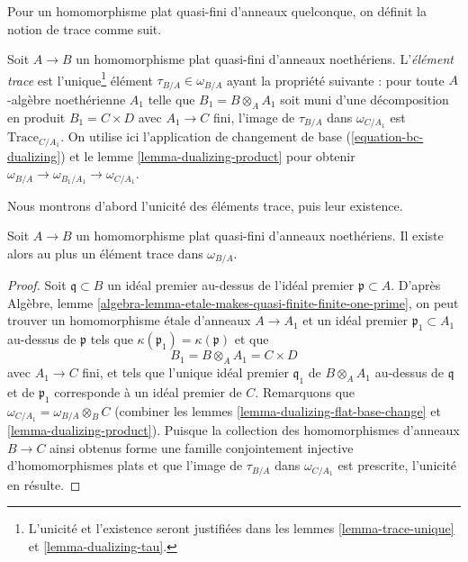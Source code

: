\medskip\noindent
Pour un homomorphisme plat quasi-fini d'anneaux quelconque, on définit la notion
de trace comme suit.

\begin{definition}
\label{definition-trace-element}
Soit $A \to B$ un homomorphisme plat quasi-fini d'anneaux noethériens.
L'{\it élément trace} est l'unique\footnote{L'unicité
et l'existence seront justifiées dans les
lemmes \ref{lemma-trace-unique} et \ref{lemma-dualizing-tau}.}
élément
$\tau_{B/A} \in \omega_{B/A}$
ayant la propriété suivante : pour toute $A$-algèbre noethérienne $A_1$
telle que $B_1 = B \otimes_A A_1$ soit muni d'une
décomposition en produit $B_1 = C \times D$ avec $A_1 \to C$ fini,
l'image de $\tau_{B/A}$ dans $\omega_{C/A_1}$
est $\text{Trace}_{C/A_1}$.
On utilise ici l'application de changement de base (\ref{equation-bc-dualizing}) et
le lemme \ref{lemma-dualizing-product} pour obtenir
$\omega_{B/A} \to \omega_{B_1/A_1} \to \omega_{C/A_1}$.
\end{definition}

\noindent
Nous montrons d'abord l'unicité des éléments trace, puis
leur existence.

\begin{lemma}
\label{lemma-trace-unique}
Soit $A \to B$ un homomorphisme plat quasi-fini d'anneaux noethériens.
Il existe alors au plus un élément trace dans $\omega_{B/A}$.
\end{lemma}

\begin{proof}
Soit $\mathfrak q \subset B$ un idéal premier au-dessus de l'idéal premier
$\mathfrak p \subset A$. D'après
Algèbre, lemme \ref{algebra-lemma-etale-makes-quasi-finite-finite-one-prime},
on peut trouver un homomorphisme étale d'anneaux $A \to A_1$ et un idéal
premier $\mathfrak p_1 \subset A_1$ au-dessus de $\mathfrak p$
tels que $\kappa(\mathfrak p_1) = \kappa(\mathfrak p)$ et
que
$$
B_1 = B \otimes_A A_1 = C \times D
$$
avec $A_1 \to C$ fini, et tels que l'unique idéal premier $\mathfrak q_1$
de $B \otimes_A A_1$ au-dessus de $\mathfrak q$ et de $\mathfrak p_1$
corresponde à un idéal premier de $C$. Remarquons que
$\omega_{C/A_1} = \omega_{B/A} \otimes_B C$
(combiner les lemmes \ref{lemma-dualizing-flat-base-change} et
\ref{lemma-dualizing-product}). Puisque la collection
des homomorphismes d'anneaux $B \to C$ ainsi obtenus forme une famille
conjointement injective d'homomorphismes plats et que l'image de $\tau_{B/A}$
dans $\omega_{C/A_1}$ est prescrite, l'unicité en résulte.
\end{proof}

